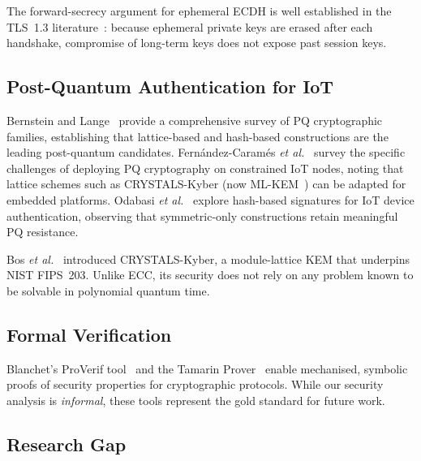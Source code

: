 \documentclass[journal]{IEEEtran}
\begin{document}
The forward-secrecy argument for ephemeral ECDH is well established in the
TLS~1.3 literature~\cite{RFC8446}: because ephemeral private keys are erased
after each handshake, compromise of long-term keys does not expose past
session keys.

\subsection{Post-Quantum Authentication for IoT}

Bernstein and Lange~\cite{Bernstein2017} provide a comprehensive survey of
PQ cryptographic families, establishing that lattice-based and hash-based
constructions are the leading post-quantum candidates. Fern\'{a}ndez-Caram\'{e}s
\emph{et al.}~\cite{Fernandezetal2023} survey the specific challenges of
deploying PQ cryptography on constrained IoT nodes, noting that lattice
schemes such as CRYSTALS-Kyber (now ML-KEM~\cite{NISTFIPS203}) can be adapted
for embedded platforms. Odabasi \emph{et al.}~\cite{Odabasietal2023} explore
hash-based signatures for IoT device authentication, observing that
symmetric-only constructions retain meaningful PQ resistance.

Bos \emph{et al.}~\cite{Brechteletal2023} introduced CRYSTALS-Kyber, a
module-lattice KEM that underpins NIST FIPS~203. Unlike ECC, its security
does not rely on any problem known to be solvable in polynomial quantum time.

\subsection{Formal Verification}

Blanchet's ProVerif tool~\cite{Blanchet2016} and the Tamarin
Prover~\cite{Meieretal2013} enable mechanised, symbolic proofs of security
properties for cryptographic protocols. While our security analysis is
\emph{informal}, these tools represent the gold standard for future work.

\subsection{Research Gap}
\end{document}
